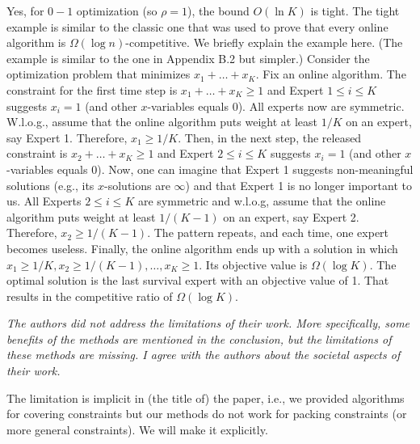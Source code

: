 \documentclass[12pt]{article}
\begin{document}
Yes, for $0-1$ optimization (so $\rho = 1$), the bound $O(\ln K)$ is tight. The tight example is similar to the classic one that was used to prove that every online algorithm is $\Omega(\log n)$-competitive. We briefly explain the example here. (The example is similar to the one in Appendix B.2 but simpler.) 
Consider the optimization problem that minimizes $x_{1} + \ldots + x_{K}$. Fix an online algorithm. The constraint for the first time step is $x_{1} + \ldots + x_{K} \geq 1$ and Expert $1 \leq i \leq K$ suggests $x_{i} = 1$ (and other $x$-variables equals 0). All experts now are symmetric. W.l.o.g., assume that the online algorithm puts weight at least $1/K$ on an expert, say Expert 1. Therefore, $x_{1} \geq 1/K$. Then, in the next step, the released constraint is $x_{2} + \ldots + x_{K} \geq 1$ and Expert $2 \leq i \leq K$ suggests $x_{i} = 1$ (and other $x$-variables equals 0). Now, one can imagine that Expert 1 suggests non-meaningful solutions (e.g., its $x$-solutions are $\infty$) and that Expert 1 is no longer important to us. All Experts $2 \leq i \leq K$ are symmetric and w.l.o.g, assume that the online algorithm puts weight at least $1/(K-1)$ on an expert, say Expert 2. Therefore, $x_{2} \geq 1/(K-1)$. The pattern repeats, and each time, one expert becomes useless. Finally, the online algorithm ends up with a solution in which $x_{1} \geq 1/K, x_{2} \geq 1/(K-1), \ldots, x_{K} \geq 1$. Its objective value is $\Omega(\log K)$. The optimal solution is the last survival expert with an objective value of 1. That results in the competitive ratio of $\Omega(\log K)$.   


\textit{\color{red}
The authors did not address the limitations of their work. More specifically, some benefits of the methods are mentioned in the conclusion, but the limitations of these methods are missing. I agree with the authors about the societal aspects of their work.
}

The limitation is implicit in (the title of) the paper, i.e., we provided algorithms for covering constraints but our methods do not work for packing constraints (or more general constraints). We will make it explicitly.  

%
%
\end{document}
